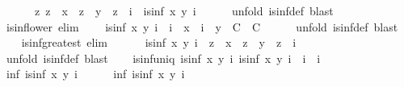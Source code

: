 \begin{isabellebody}
\ \ \ \ \ \ {\isacharparenleft}{\isasymAnd}z{\isachardot}\ z\ {\isasymsqsubseteq}\ x\ {\isasymLongrightarrow}\ z\ {\isasymsqsubseteq}\ y\ {\isasymLongrightarrow}\ z\ {\isasymsqsubseteq}\ i{\isacharparenright}\ {\isasymLongrightarrow}\ is{\isacharunderscore}inf\ x\ y\ i{\isachardoublequoteclose}\isanewline
\ \ \ \ \isamarkupfalse%
\ {\isacharparenleft}unfold\ is{\isacharunderscore}inf{\isacharunderscore}def{\isacharparenright}\ blast\isanewline
\isanewline
\ \ \isamarkupfalse%
\ is{\isacharunderscore}inf{\isacharunderscore}lower\ {\isacharbrackleft}elim{\isacharquery}{\isacharbrackright}{\isacharcolon}\isanewline
\ \ \ \ {\isachardoublequoteopen}is{\isacharunderscore}inf\ x\ y\ i\ {\isasymLongrightarrow}\ {\isacharparenleft}i\ {\isasymsqsubseteq}\ x\ {\isasymLongrightarrow}\ i\ {\isasymsqsubseteq}\ y\ {\isasymLongrightarrow}\ C{\isacharparenright}\ {\isasymLongrightarrow}\ C{\isachardoublequoteclose}\isanewline
\ \ \ \ \isamarkupfalse%
\ {\isacharparenleft}unfold\ is{\isacharunderscore}inf{\isacharunderscore}def{\isacharparenright}\ blast\isanewline
\isanewline
\ \ \isamarkupfalse%
\ is{\isacharunderscore}inf{\isacharunderscore}greatest\ {\isacharbrackleft}elim{\isacharquery}{\isacharbrackright}{\isacharcolon}\isanewline
\ \ \ \ \ \ {\isachardoublequoteopen}is{\isacharunderscore}inf\ x\ y\ i\ {\isasymLongrightarrow}\ z\ {\isasymsqsubseteq}\ x\ {\isasymLongrightarrow}\ z\ {\isasymsqsubseteq}\ y\ {\isasymLongrightarrow}\ z\ {\isasymsqsubseteq}\ i{\isachardoublequoteclose}\isanewline
\ \ \ \ \isamarkupfalse%
\ {\isacharparenleft}unfold\ is{\isacharunderscore}inf{\isacharunderscore}def{\isacharparenright}\ blast%
\endisataginvisible
{\isafoldinvisible}%
%
\isadeliminvisible
\isanewline
%
\endisadeliminvisible
\isanewline
\ \ \isamarkupfalse%
\ is{\isacharunderscore}inf{\isacharunderscore}uniq{\isacharcolon}\ {\isachardoublequoteopen}{\isasymlbrakk}is{\isacharunderscore}inf\ x\ y\ i{\isacharsemicolon}\ is{\isacharunderscore}inf\ x\ y\ i{\isacharprime}{\isasymrbrakk}\ {\isasymLongrightarrow}\ i\ {\isacharequal}\ i{\isacharprime}{\isachardoublequoteclose}\isanewline
%
\isadelimproof
\ \ %
\endisadelimproof
%
\isatagproof
{}\isamarkupfalse%
\ {\isacharminus}\isanewline
\ \ \ \ \isamarkupfalse%
\ inf{\isacharcolon}\ {\isachardoublequoteopen}is{\isacharunderscore}inf\ x\ y\ i{\isachardoublequoteclose}\isanewline
\ \ \ \ \isamarkupfalse%
\ inf{\isacharprime}{\isacharcolon}\ {\isachardoublequoteopen}is{\isacharunderscore}inf\ x\ y\ i{\isacharprime}{\isachardoublequoteclose}\isanewline

\end{isabellebody}
